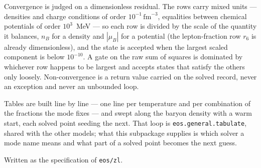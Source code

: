 \documentclass[aps,prc,onecolumn,superscriptaddress,nofootinbib,10pt]{revtex4-2}
\newcommand{\nB}{n_B}
\newcommand{\muB}{\mu_B}
\begin{document}
Convergence is judged on a dimensionless residual. The rows carry mixed units
--- densities and charge conditions of order $10^{-1}\,\mathrm{fm}^{-3}$,
equalities between chemical potentials of order $10^{3}$~MeV --- so each row
is divided by the scale of the quantity it balances, $\nB$ for a density and
$|\muB|$ for a potential (the lepton-fraction row $r_6$ is already
dimensionless), and the state is accepted when the largest scaled component is
below $10^{-10}$. A gate on the raw sum of squares is dominated by whichever
row happens to be largest and accepts states that satisfy the others only
loosely. Non-convergence is a return value carried on the solved record, never
an exception and never an unbounded loop.

Tables are built line by line --- one line per temperature and per combination
of the fractions the mode fixes --- and swept along the baryon density with a
warm start, each solved point seeding the next. That loop is
\texttt{eos.general.tabulate}, shared with the other models; what this
subpackage supplies is which solver a mode name means and what part of a
solved point becomes the next guess.

\begin{acknowledgments}
Written as the specification of \texttt{eos/zl}.
\end{acknowledgments}


\end{document}
